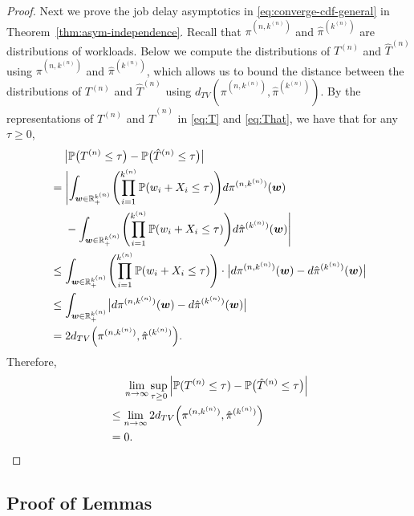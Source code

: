 \documentclass[sigconf]{acmart}
\renewcommand{\Pr}{\mathbb{P}} %
\newcommand{\supn}{^{(n)}}
\begin{document}
\begin{proof}
Next we prove the job delay asymptotics in \eqref{eq:converge-cdf-general} in Theorem~\ref{thm:asym-independence}.  Recall that $\pi^{(n,k\supn)}$ and $\hat{\pi}^{(k\supn)}$ are distributions of workloads.  Below we compute the distributions of $T\supn$ and $\hat{T}\supn$ using $\pi^{(n,k\supn)}$ and $\hat{\pi}^{(k\supn)}$, which allows us to bound the distance between the distributions of $T\supn$ and $\hat{T}\supn$ using $d_{TV}\left(\pi^{(n,k\supn)},\hat{\pi}^{(k\supn)}\right)$.  By the representations of $T\supn$ and $\hat{T}\supn$ in \eqref{eq:T} and \eqref{eq:That}, we have that for any $\tau\ge 0$,
\begin{align*}
&\mspace{23mu}\bigl|\Pr\bigl(T\supn\le \tau\bigr)-\Pr\bigl(\hat{T}\supn\le \tau\bigr)\bigr|\\
&=\Biggl|\int_{\bm{w}\in\mathbb{R}_+^{k\supn}}\Biggl(\prod_{i=1}^{k\supn}\Pr(w_i+X_i\le\tau)\Biggr)d\pi^{(n,k\supn)}(\bm{w})\\
&\mspace{24mu}-\int_{\bm{w}\in\mathbb{R}_+^{k\supn}}\Biggl(\prod_{i=1}^{k\supn}\Pr(w_i+X_i\le\tau)\Biggr)d\hat{\pi}^{(k\supn)}(\bm{w})\Biggr|\\
&\le \int_{\bm{w}\in\mathbb{R}_+^{k\supn}}\Biggl(\prod_{i=1}^{k\supn}\Pr(w_i+X_i\le\tau)\Biggr)\cdot\bigl|d\pi^{(n,k\supn)}(\bm{w})-d\hat{\pi}^{(k\supn)}(\bm{w})\bigr|\\
&\le \int_{\bm{w}\in\mathbb{R}_+^{k\supn}}\bigl|d\pi^{(n,k\supn)}(\bm{w})-d\hat{\pi}^{(k\supn)}(\bm{w})\bigr|\\
&=2 d_{TV}\Bigl(\pi^{(n,k\supn)},\hat{\pi}^{(k\supn)}\Bigr).
\end{align*}
Therefore,
\begin{align*}
&\mspace{23mu}\lim_{n\to\infty}\sup_{\tau\ge 0} \left|\Pr(T\supn\le\tau)-\Pr\bigl(\hat{T}\supn\le \tau\bigr)\right|\\
&\le \lim_{n\to\infty}2 d_{TV}\Bigl(\pi^{(n,k\supn)},\hat{\pi}^{(k\supn)}\Bigr)\\
&=0.
\end{align*}
\end{proof}

\subsection{Proof of Lemmas}
\end{document}
